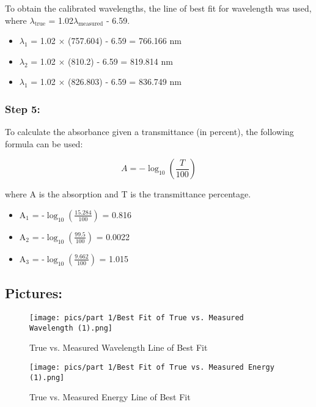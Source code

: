 \documentclass[10pt, letterpaper, twoside]{article}
\begin{document}
To obtain the calibrated wavelengths, the line of best fit for wavelength was used, where $\lambda_{\text{true}}$ = 1.02$\lambda_{\text{measured}}$ - 6.59.

\begin{itemize}
    \item $\lambda_1$ = 1.02 $\times$ (757.604) - 6.59 = 766.166 nm
    \item $\lambda_2$ = 1.02 $\times$ (810.2) - 6.59 = 819.814 nm
    \item $\lambda_1$ = 1.02 $\times$ (826.803) - 6.59 = 836.749 nm
\end{itemize}

\subsubsection{Step 5:}

To calculate the absorbance given a transmittance (in percent), the following formula can be used:

\begin{equation*}
    A = -\log_{10}(\frac{T}{100})
\end{equation*}

where A is the absorption and T is the transmittance percentage.

\begin{itemize}
    \item A$_1$ = -$\log_{10}(\frac{15.284}{100})$ = 0.816
    \item A$_2$ = -$\log_{10}(\frac{99.5}{100})$ = 0.0022
    \item A$_3$ = -$\log_{10}(\frac{9.662}{100})$ = 1.015
\end{itemize}

\vfill\pagebreak

\subsection{Pictures:}
\begin{figure}[!ht]
    \centering
\texttt{[image: pics/part 1/Best Fit of True vs. Measured Wavelength (1).png]}
    \caption{True vs. Measured Wavelength Line of Best Fit}
    \label{fig:my_label}
\end{figure}
\begin{figure}[!ht]
    \centering
\texttt{[image: pics/part 1/Best Fit of True vs. Measured Energy (1).png]}
    \caption{True vs. Measured Energy Line of Best Fit}
    \label{fig:my_label}
\end{figure}
\end{document}
